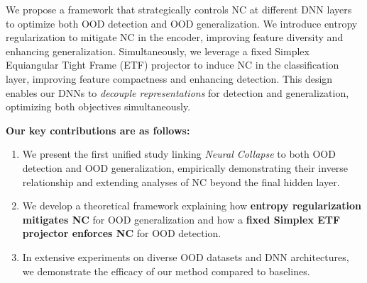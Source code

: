 We propose a framework that strategically controls NC at different DNN layers to optimize both OOD detection and OOD generalization. We introduce entropy regularization to mitigate NC in the encoder, improving feature diversity and enhancing generalization. Simultaneously, we leverage a fixed Simplex Equiangular Tight Frame (ETF) projector to induce NC in the classification layer, improving feature compactness and enhancing detection. This design enables our DNNs to \textit{decouple representations} for detection and generalization, optimizing both objectives simultaneously.

\textbf{Our key contributions are as follows:}
\begin{enumerate}[noitemsep, nolistsep, leftmargin=*]
    \item We present the first unified study linking \textit{Neural Collapse} to both OOD detection and OOD generalization, empirically demonstrating their inverse relationship and extending analyses of NC beyond the final hidden layer.
    \item We develop a theoretical framework explaining how \textbf{entropy regularization mitigates NC} for OOD generalization and how a \textbf{fixed Simplex ETF projector enforces NC} for OOD detection.

    \item In extensive experiments on diverse OOD datasets and DNN architectures, we demonstrate the efficacy of our method compared to baselines. 
\end{enumerate}


